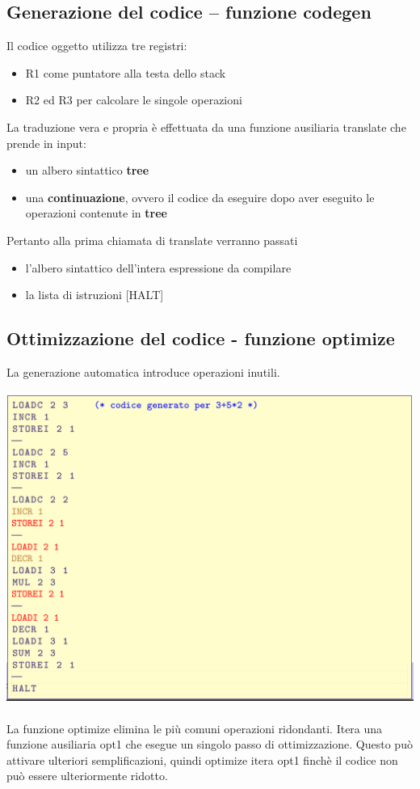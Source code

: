 \documentclass[10pt]{article}
\begin{document}
\subsection{Generazione del codice – funzione codegen}
Il codice oggetto utilizza tre registri:
\begin{itemize}
    \item R1 come puntatore alla testa dello stack
    \item R2 ed R3 per calcolare le singole operazioni
\end{itemize}
La traduzione vera e propria è effettuata da una funzione ausiliaria translate che prende in input:
\begin{itemize}
    \item un albero sintattico \textbf{tree}
    \item una \textbf{continuazione}, ovvero il codice da eseguire dopo aver eseguito le operazioni
    contenute in \textbf{tree}
\end{itemize}
Pertanto alla prima chiamata di translate verranno passati
\begin{itemize}
    \item l’albero sintattico dell’intera espressione da compilare
    \item la lista di istruzioni [HALT]
\end{itemize}
\subsection{Ottimizzazione del codice - funzione optimize}
La generazione automatica introduce operazioni inutili.

\includegraphics[scale=0.3]{Immagini/comp4.png}
\\\\
La funzione optimize elimina le più comuni operazioni
ridondanti.
Itera una funzione ausiliaria opt1 che esegue un singolo passo di
ottimizzazione.
Questo può attivare ulteriori semplificazioni, quindi optimize
itera opt1 finchè il codice non può essere ulteriormente ridotto.
\end{document}

